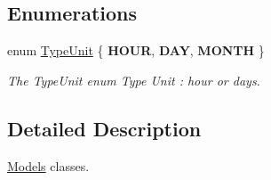 \subsection*{Enumerations}
\begin{DoxyCompactItemize}
\item 
enum \hyperlink{namespaceModels_a999532b323a4b63ff54013326c83f040}{Type\-Unit} \{ {\bfseries H\-O\-U\-R}, 
{\bfseries D\-A\-Y}, 
{\bfseries M\-O\-N\-T\-H}
 \}
\begin{DoxyCompactList}\small\item\em The Type\-Unit enum Type Unit \-: hour or days. \end{DoxyCompactList}\end{DoxyCompactItemize}


\subsection{Detailed Description}
\hyperlink{namespaceModels}{Models} classes. 